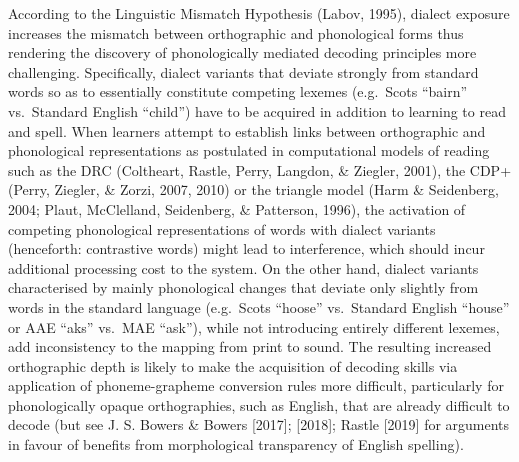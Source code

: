 \documentclass[doc,floatsintext]{apa6}
\begin{document}
According to the Linguistic Mismatch Hypothesis (Labov, 1995), dialect
exposure increases the mismatch between orthographic and phonological
forms thus rendering the discovery of phonologically mediated decoding
principles more challenging. Specifically, dialect variants that deviate
strongly from standard words so as to essentially constitute competing
lexemes (e.g.~Scots \enquote{bairn} vs.~Standard English
\enquote{child}) have to be acquired in addition to learning to read and
spell. When learners attempt to establish links between orthographic and
phonological representations as postulated in computational models of
reading such as the DRC (Coltheart, Rastle, Perry, Langdon, \& Ziegler,
2001), the CDP+ (Perry, Ziegler, \& Zorzi, 2007, 2010) or the triangle
model (Harm \& Seidenberg, 2004; Plaut, McClelland, Seidenberg, \&
Patterson, 1996), the activation of competing phonological
representations of words with dialect variants (henceforth: contrastive
words) might lead to interference, which should incur additional
processing cost to the system. On the other hand, dialect variants
characterised by mainly phonological changes that deviate only slightly
from words in the standard language (e.g.~Scots \enquote{hoose}
vs.~Standard English \enquote{house} or AAE \enquote{aks} vs.~MAE
\enquote{ask}), while not introducing entirely different lexemes, add
inconsistency to the mapping from print to sound. The resulting
increased orthographic depth is likely to make the acquisition of
decoding skills via application of phoneme-grapheme conversion rules
more difficult, particularly for phonologically opaque orthographies,
such as English, that are already difficult to decode (but see J. S.
Bowers \& Bowers {[}2017{]}; {[}2018{]}; Rastle {[}2019{]} for arguments
in favour of benefits from morphological transparency of English
spelling).
\end{document}
